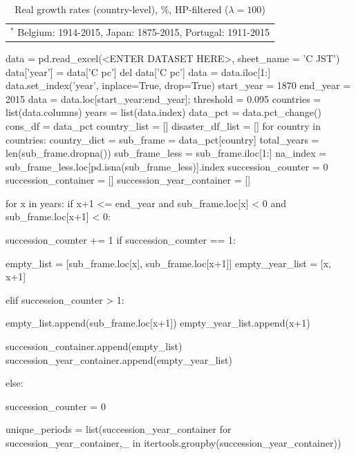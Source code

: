 {{{{\begin{table}[H]
\begin{center}
\begin{tabular}{rccccccccccc}
\hline
\hline
\multicolumn{12}{c}{$^{*}$ Belgium: 1914-2015, Japan: 1875-2015, Portugal: 1911-2015}
\end{tabular} 
\end{center}
\caption{Real growth rates (country-level), \%, HP-filtered ($\lambda=100$)}
\label{tab:real_growth_countries_HP}
\end{table}


\begin{python}
data = pd.read_excel(<ENTER DATASET HERE>, sheet_name = 'C JST')
data['year'] = data['C pc']
del data['C pc']
data = data.iloc[1:]
data.set_index('year', inplace=True, drop=True)
start_year = 1870
end_year = 2015
data = data.loc[start_year:end_year];
threshold = 0.095
countries = list(data.columns)
years = list(data.index)
data_pct = data.pct_change()
cons_df = data_pct
country_list = []
disaster_df_list = []
for country in countries:
    country_dict = {}
    sub_frame = data_pct[country]
    total_years = len(sub_frame.dropna())
    sub_frame_less = sub_frame.iloc[1:]
    na_index = sub_frame_less.loc[pd.isna(sub_frame_less)].index
    succession_counter = 0
    succession_container = []
    succession_year_container = []
    
    for x in years:
        if x+1 <= end_year and sub_frame.loc[x] < 0 and sub_frame.loc[x+1] < 0:
        
        	succession_counter += 1
            if succession_counter == 1:
                
                empty_list = [sub_frame.loc[x], sub_frame.loc[x+1]]
                empty_year_list = [x, x+1]
                
            elif succession_counter > 1:
                
                empty_list.append(sub_frame.loc[x+1])
                empty_year_list.append(x+1)
                
            succession_container.append(empty_list)
            succession_year_container.append(empty_year_list)
                   
        else:
      
            succession_counter = 0
        
    unique_periods = list(succession_year_container for succession_year_container,_ in itertools.groupby(succession_year_container))
    

\end{python}}}}}
